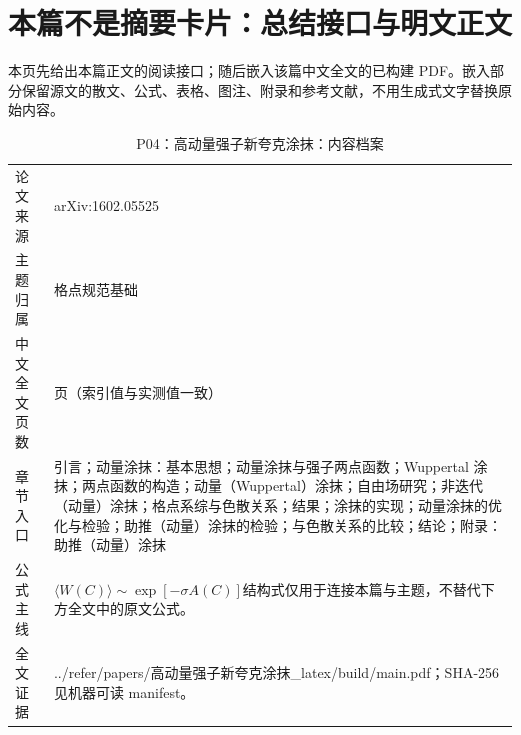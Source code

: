 \documentclass[UTF8,11pt,oneside]{ctexbook}
\begin{document}
\section*{本篇不是摘要卡片：总结接口与明文正文}
本页先给出本篇正文的阅读接口；随后嵌入该篇中文全文的已构建 PDF。嵌入部分保留源文的散文、公式、表格、图注、附录和参考文献，不用生成式文字替换原始内容。
\begin{table}[htbp]
  \centering
  \caption{P04：高动量强子新夸克涂抹：内容档案}
  \small
  \begin{tabularx}{0.96\textwidth}{@{}p{3.3cm}>{\raggedright\arraybackslash}X@{}}
    \toprule
    论文来源 & arXiv:1602.05525 \\
    主题归属 & 格点规范基础 \\
    中文全文页数 & 23 页（索引值与实测值一致） \\
    章节入口 & 引言；动量涂抹：基本思想；动量涂抹与强子两点函数；Wuppertal 涂抹；两点函数的构造；动量（Wuppertal）涂抹；自由场研究；非迭代（动量）涂抹；格点系综与色散关系；结果；涂抹的实现；动量涂抹的优化与检验；助推（动量）涂抹的检验；与色散关系的比较；结论；附录：助推（动量）涂抹 \\
    公式主线 & $\langle W(C)\rangle\sim\exp[-\sigma A(C)]$\newline\scriptsize 结构式仅用于连接本篇与主题，不替代下方全文中的原文公式。 \\
    全文证据 & ../\allowbreak{}refer/\allowbreak{}papers/\allowbreak{}高动量强子新夸克涂抹\_\allowbreak{}latex/\allowbreak{}build/\allowbreak{}main.pdf；SHA-256 见机器可读 manifest。 \\
    \bottomrule
  \end{tabularx}
\end{table}
\end{document}
